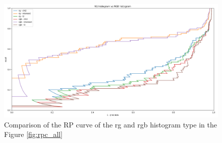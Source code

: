 \documentclass{article}
\begin{document}
\begin{figure}[ht]
\centering
\includegraphics[width=\textwidth]{rpc_rg_vs_rgb}
\caption{Comparison of the RP curve of the rg and rgb histogram type in the Figure \ref{fig:rpc_all}}
\label{fig:rpc_rg_vs_rgb}
\end{figure}
\end{document}
